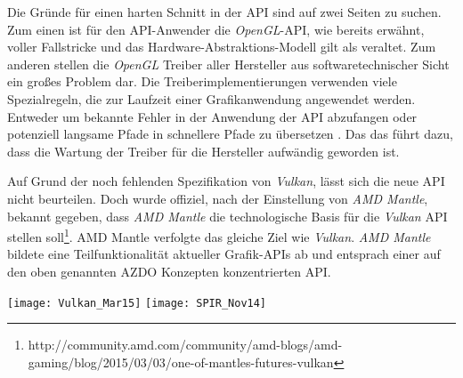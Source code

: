 Die Gründe für einen harten Schnitt in der \ac{API} sind auf zwei Seiten zu suchen. Zum einen ist für den API-Anwender die \textit{OpenGL}-API, wie bereits erwähnt, voller Fallstricke und das Hardware-Abstraktions-Modell gilt als veraltet. Zum anderen stellen die \textit{OpenGL} Treiber aller Hersteller aus softwaretechnischer Sicht ein großes Problem dar. Die Treiberimplementierungen verwenden viele Spezialregeln, die zur Laufzeit einer Grafikanwendung angewendet werden. Entweder um bekannte Fehler in der Anwendung der API abzufangen oder potenziell langsame Pfade in schnellere Pfade zu übersetzen \parencite{gamedevnet:glnext}. Das das führt dazu, dass die Wartung der Treiber für die Hersteller aufwändig geworden ist.

Auf Grund der noch fehlenden Spezifikation von \textit{Vulkan}, lässt sich die neue API nicht beurteilen. Doch wurde offiziel, nach der Einstellung von \textit{AMD Mantle}, bekannt gegeben, dass \textit{AMD Mantle} die technologische Basis für die \textit{Vulkan} \ac{API} stellen soll\footnote{http://community.amd.com/community/amd-blogs/amd-gaming/blog/2015/03/03/one-of-mantles-futures-vulkan}. {AMD Mantle} verfolgte das gleiche Ziel wie \textit{Vulkan}. \textit{AMD Mantle} bildete eine Teilfunktionalität aktueller Grafik-\acp{API} ab und entsprach einer auf den oben genannten \ac{AZDO} Konzepten konzentrierten \ac{API}.

\begin{figure*}
\centering
	\texttt{[image: Vulkan\_Mar15]}
	\texttt{[image: SPIR\_Nov14]}
\end{figure*}



